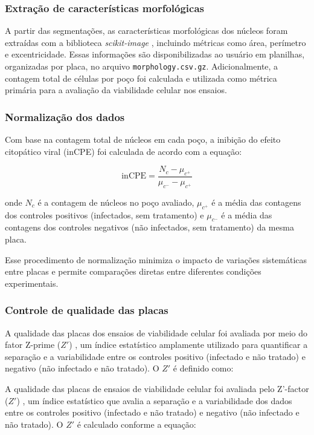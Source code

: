 \documentclass[12pt]{article}
\begin{document}
\subsubsection{Extração de características morfológicas}

A partir das segmentações, as características morfológicas dos núcleos foram extraídas com a biblioteca \textit{scikit-image} \cite{vanderWalt2014}, incluindo métricas como área, perímetro e excentricidade. Essas informações são disponibilizadas ao usuário em planilhas, organizadas por placa, no arquivo \texttt{morphology.csv.gz}. Adicionalmente, a contagem total de células por poço foi calculada e utilizada como métrica primária para a avaliação da viabilidade celular nos ensaios.

\subsubsection{Normalização dos dados}

Com base na contagem total de núcleos em cada poço, a inibição do efeito citopático viral (inCPE) foi calculada de acordo com a equação:

\begin{equation}
  \mathrm{inCPE} = \frac{N_{c} - \mu_{c^{+}}}{\mu _{c^{-}} - \mu_{c^{+}}}
\end{equation}

\noindent onde $N_{c}$ é a contagem de núcleos no poço avaliado, $\mu _{c^{+}}$ é a média das contagens dos controles positivos (infectados, sem tratamento) e $\mu _{c^{-}}$ é a média das contagens dos controles negativos (não infectados, sem tratamento) da mesma placa.

Esse procedimento de normalização minimiza o impacto de variações sistemáticas entre placas e permite comparações diretas entre diferentes condições experimentais.

\subsubsection{Controle de qualidade das placas}

A qualidade das placas dos ensaios de viabilidade celular foi avaliada por meio do fator Z-prime ($Z'$) \cite{Zhang1999,Bray2004}, um índice estatístico amplamente utilizado para quantificar a separação e a variabilidade entre os controles positivo (infectado e não tratado) e negativo (não infectado e não tratado). O $Z'$ é definido como:

A qualidade das placas de ensaios de viabilidade celular foi avaliada pelo Z'-factor ($Z'$) \cite{Zhang,Zhang1999}, um índice estatístico que avalia a separação e a variabilidade dos dados entre os controles positivo (infectado e não tratado) e negativo (não infectado e não tratado). O $Z'$ é calculado conforme a equação:
\end{document}
